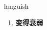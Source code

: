 
\begin{frame}
{\huge languish}
\begin{center}
\begin{enumerate}\Large
  \item \textbf{变得衰弱}
\end{enumerate}
\end{center}
\end{frame}
